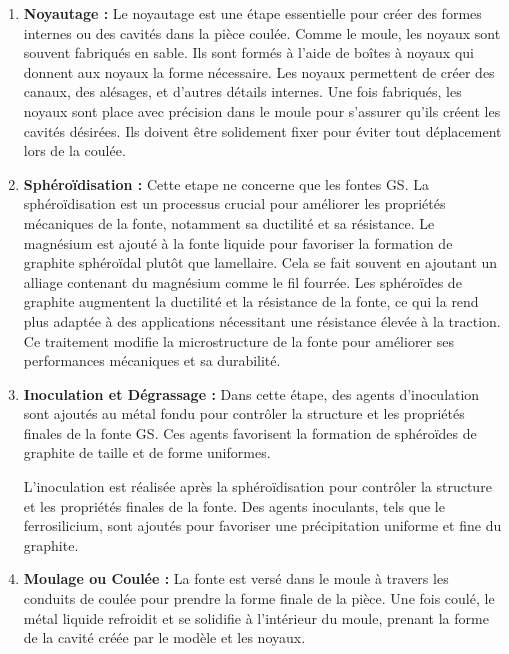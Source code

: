 \documentclass[12pt]{article}
\begin{document}
\begin{enumerate}


    \item \textbf{Noyautage :} 
    Le noyautage est une étape essentielle pour créer des formes internes ou des 
    cavités dans la pièce coulée. Comme le moule, les noyaux sont souvent fabriqués 
    en sable. Ils sont formés à l'aide de boîtes à noyaux qui donnent aux noyaux la 
    forme nécessaire. Les noyaux permettent de créer des canaux, des alésages, et 
    d'autres détails internes. Une fois fabriqués, les noyaux sont place avec précision
    dans le moule pour s'assurer qu'ils créent les cavités désirées. Ils doivent être 
    solidement fixer pour éviter tout déplacement lors de la coulée.


    \item \textbf{Sphéroïdisation :} 
    Cette etape ne concerne que les fontes GS. 
    La sphéroïdisation est un processus crucial pour améliorer les propriétés mécaniques 
    de la fonte, notamment sa ductilité et sa résistance.
    Le magnésium est ajouté à la fonte liquide pour favoriser la formation de graphite 
    sphéroïdal plutôt que lamellaire. Cela se fait souvent en ajoutant un alliage 
    contenant du magnésium comme le fil fourrée. Les sphéroïdes de graphite augmentent la ductilité et la résistance de la fonte, 
    ce qui la rend plus adaptée à des applications nécessitant une résistance élevée 
    à la traction. Ce traitement modifie la microstructure de la fonte pour améliorer ses performances
    mécaniques et sa durabilité.



    \item \textbf{Inoculation et Dégrassage :} Dans cette étape, des agents d'inoculation sont 
    ajoutés au métal fondu pour contrôler la structure et les propriétés finales de 
    la fonte GS. Ces agents favorisent la formation de sphéroïdes de graphite de 
    taille et de forme uniformes.

    L'inoculation est réalisée après la sphéroïdisation pour contrôler la structure 
    et les propriétés finales de la fonte. Des agents inoculants, tels que le 
    ferrosilicium, sont ajoutés pour favoriser une précipitation uniforme et fine 
    du graphite.

    
    \item \textbf{Moulage ou Coulée :} La fonte est  versé dans 
    le moule à travers les conduits de coulée pour prendre la forme finale de la pièce. Une 
    fois coulé, le métal liquide refroidit et se solidifie à l'intérieur du moule, prenant la 
    forme de la cavité créée par le modèle et les noyaux.




\end{enumerate}
\end{document}

